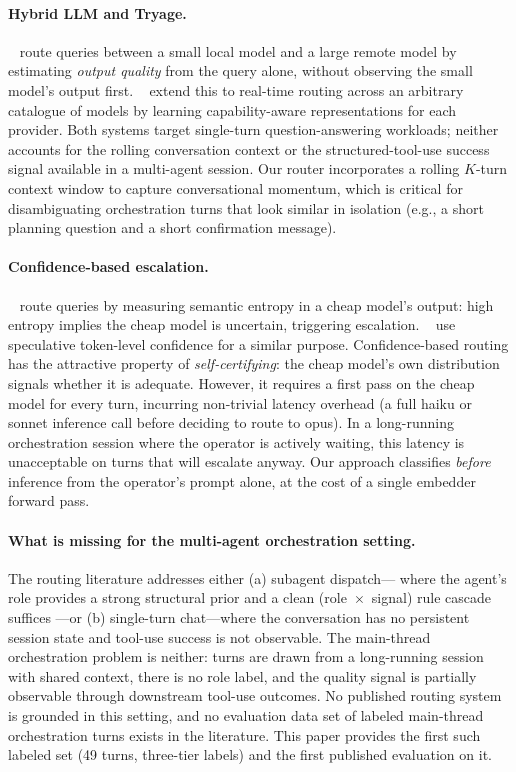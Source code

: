 \paragraph{Hybrid LLM and Tryage.}
\citeauthor{hybridllm}~\cite{hybridllm} route queries between a
small local model and a large remote model by estimating
\emph{output quality} from the query alone, without observing the
small model's output first. \citeauthor{tryage}~\cite{tryage}
extend this to real-time routing across an arbitrary catalogue of
models by learning capability-aware representations for each
provider. Both systems target single-turn question-answering
workloads; neither accounts for the rolling conversation context
or the structured-tool-use success signal available in a
multi-agent session. Our router incorporates a rolling \(K\)-turn
context window to capture conversational momentum, which is
critical for disambiguating orchestration turns that look similar
in isolation (e.g., a short planning question and a short
confirmation message).

\paragraph{Confidence-based escalation.}
\citeauthor{semanticentropy}~\cite{semanticentropy} route queries
by measuring semantic entropy in a cheap model's output: high
entropy implies the cheap model is uncertain, triggering
escalation. \citeauthor{aggarwal2024routingconfidence}~\cite{aggarwal2024routingconfidence}
use speculative token-level confidence for a similar purpose.
Confidence-based routing has the attractive property of
\emph{self-certifying}: the cheap model's own distribution signals
whether it is adequate. However, it requires a first pass on the
cheap model for every turn, incurring non-trivial latency overhead
(a full haiku or sonnet inference call before deciding to route to
opus). In a long-running orchestration session where the operator
is actively waiting, this latency is unacceptable on turns that
will escalate anyway. Our approach classifies \emph{before}
inference from the operator's prompt alone, at the cost of a
single embedder forward pass.

\paragraph{What is missing for the multi-agent orchestration setting.}
The routing literature addresses either (a) subagent dispatch---
where the agent's role provides a strong structural prior and a
clean (role~\(\times\)~signal) rule cascade suffices
\cite{moa1landscape}---or (b) single-turn chat---where the
conversation has no persistent session state and tool-use success
is not observable. The main-thread orchestration problem is
neither: turns are drawn from a long-running session with shared
context, there is no role label, and the quality signal is
partially observable through downstream tool-use outcomes. No
published routing system is grounded in this setting, and no
evaluation data set of labeled main-thread orchestration turns
exists in the literature. This paper provides the first such
labeled set (49 turns, three-tier labels) and the first published
evaluation on it.

